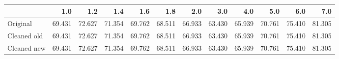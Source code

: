 \begin{tabular}{lrrrrrrrrrrr}
\toprule
{} &    1.0 &    1.2 &    1.4 &    1.6 &    1.8 &    2.0 &    3.0 &    4.0 &    5.0 &    6.0 &    7.0 \\
\midrule
Original    & 69.431 & 72.627 & 71.354 & 69.762 & 68.511 & 66.933 & 63.430 & 65.939 & 70.761 & 75.410 & 81.305 \\
Cleaned old & 69.431 & 72.627 & 71.354 & 69.762 & 68.511 & 66.933 & 63.430 & 65.939 & 70.761 & 75.410 & 81.305 \\
Cleaned new & 69.431 & 72.627 & 71.354 & 69.762 & 68.511 & 66.933 & 63.430 & 65.939 & 70.761 & 75.410 & 81.305 \\
\bottomrule
\end{tabular}
